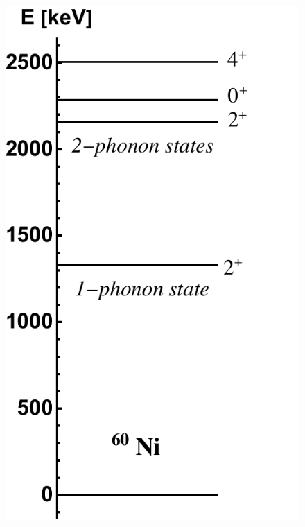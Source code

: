 \begin{figure}
    \includegraphics[scale=0.55]{Chapters/Figures/60Ni_vib_experimental.pdf}

\end{figure}
